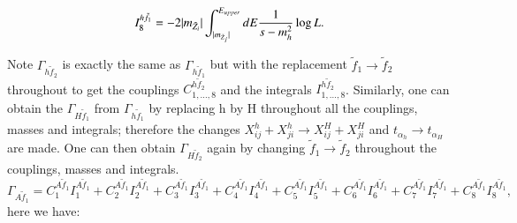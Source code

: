 \documentclass[final,3p,times,pdflatex]{elsarticle}
\begin{document}
\begin{equation}
I_{8}^{h \tilde{f}_1} = -2|m_{\tilde{Z}_i}|\int_{|m_{\tilde{Z}_j}|}^{E_{upper}} dE {1 \over s-m_{h}^2} \log L.
\end{equation}

Note $\Gamma_{h \tilde{f}_2}$ is exactly the same as $\Gamma_{h \tilde{f}_1}$ but with the replacement $\tilde{f}_1 \rightarrow \tilde{f}_2$ throughout to get the couplings $C_{1,\ldots,8}^{h \tilde{f}_2}$ and the integrals $I_{1,\ldots,8}^{h \tilde{f}_2}$.
Similarly, one can obtain the $\Gamma_{H \tilde{f}_1}$ from $\Gamma_{h \tilde{f}_1}$ by replacing h by H throughout all the couplings, masses and integrals; therefore the changes $X_{ij}^h + X_{ji}^h \rightarrow X_{ij}^H + X_{ji}^H$ and $t_{\alpha_h} \rightarrow t_{\alpha_H}$ are made. One can then obtain $\Gamma_{H \tilde{f}_2}$ again by changing $\tilde{f}_1 \rightarrow \tilde{f}_2$ throughout the couplings, masses and integrals.
\begin{equation}
\Gamma_{A \tilde{f}_1} = C_{1}^{A \tilde{f}_1} I_{1}^{A \tilde{f}_1} + C_{2}^{A \tilde{f}_1} I_{2}^{A \tilde{f}_1} + C_{3}^{A \tilde{f}_1} I_{3}^{A \tilde{f}_1} + C_{4}^{A \tilde{f}_1} I_{4}^{A \tilde{f}_1} + C_{5}^{A \tilde{f}_1} I_{5}^{A \tilde{f}_1} + C_{6}^{A \tilde{f}_1} I_{6}^{A \tilde{f}_1} + C_{7}^{A \tilde{f}_1} I_{7}^{A \tilde{f}_1} + C_{8}^{A \tilde{f}_1} I_{8}^{A \tilde{f}_1},
\end{equation}
here we have:
\end{document}
